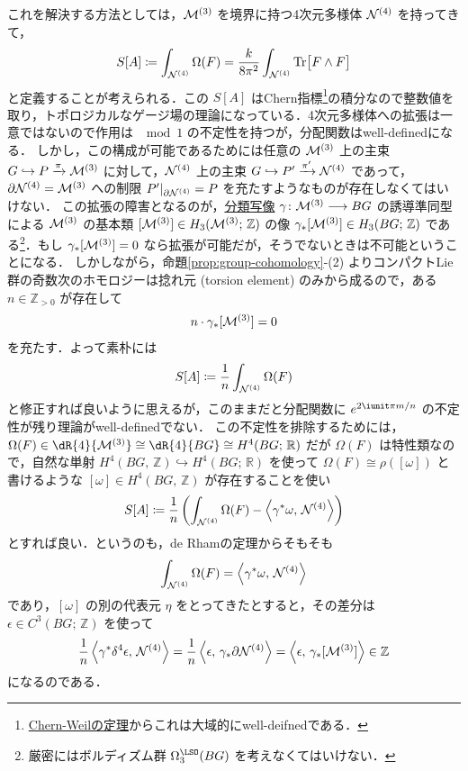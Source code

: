 \documentclass[TQFT_main]{subfiles}
\begin{document}
これを解決する方法としては，$\mathcal{M}^{(3)}$ を境界に持つ4次元多様体 $\mathcal{N}^{(4)}$ を持ってきて，
\begin{align}
    S[A] \coloneqq \int_{\mathcal{N}^{(4)}} \Omega(F) = \frac{k}{8\pi^2} \int_{\mathcal{N}^{(4)}} \Tr \bigl[ F \wedge F \bigr] 
\end{align}
と定義することが考えられる．この $S[A]$ はChern指標\footnote{\hyperref[thm:Chern-Weil]{Chern-Weilの定理}からこれは大域的にwell-deifnedである．}の積分なので整数値を取り，トポロジカルなゲージ場の理論になっている．4次元多様体への拡張は一意ではないので作用は $\mod 1$ の不定性を持つが，分配関数はwell-definedになる．
しかし，この構成が可能であるためには任意の $\mathcal{M}^{(3)}$ 上の主束 $G \hookrightarrow P \xrightarrow{\pi} \mathcal{M}^{(3)}$ に対して，$\mathcal{N}^{(4)}$ 上の主束 $G \hookrightarrow P' \xrightarrow{\pi'} \mathcal{N}^{(4)}$ であって，$\partial \mathcal{N}^{(4)} = \mathcal{M}^{(3)}$ への制限 $P'|_{\partial \mathcal{N}^{(4)}} = P$ を充たすようなものが存在しなくてはいけない．
この拡張の障害となるのが，\hyperref[prop:universal-basic]{分類写像} $\gamma \colon \mathcal{M}^{(3)} \longrightarrow BG$ の誘導準同型による $\mathcal{M}^{(3)}$ の基本類 $[\mathcal{M}^{(3)}] \in H_3(\mathcal{M}^{(3)};\, \mathbb{Z})$ の像 $\gamma_* [\mathcal{M}^{(3)}] \in H_3(BG;\, \mathbb{Z})$ である\footnote{厳密にはボルディズム群 $\Omega^{\LSO}_{3} (BG)$ を考えなくてはいけない．}．もし $\gamma_* [\mathcal{M}^{(3)}] = 0$ なら拡張が可能だが，そうでないときは不可能ということになる．
しかしながら，命題\ref{prop:group-cohomology}-(2) よりコンパクトLie群の奇数次のホモロジーは捻れ元 (torsion element) のみから成るので，ある $n \in \mathbb{Z}_{> 0}$ が存在して
\begin{align}
    n \cdot \gamma_* [\mathcal{M}^{(3)}] = 0
\end{align}
を充たす．よって素朴には
\begin{align}
    S[A] \coloneqq \frac{1}{n} \int_{\mathcal{N}^{(4)}} \Omega(F)
\end{align}
と修正すれば良いように思えるが，このままだと分配関数に $e^{2\iunit \pi m/n}$ の不定性が残り理論がwell-definedでない．
この不定性を排除するためには，$\Omega(F) \in \dR{4}{\mfdcal{M}{3}} \cong \dR{4}{BG} \cong H^4(BG;\, \mathbb{R})$ だが $\Omega(F)$ は特性類なので，自然な単射 $H^4(BG,\, \mathbb{Z}) \hookrightarrow H^4(BG;\, \mathbb{R})$ を使って $\Omega(F) \cong \rho ([\omega])$ と書けるような $[\omega] \in H^4(BG,\, \mathbb{Z})$ が存在することを使い
\begin{align}
    S[A] \coloneqq \frac{1}{n} \left(\int_{\mathcal{N}^{(4)}} \Omega(F) - \expval{\gamma^* \omega,\, \mathcal{N}^{(4)}} \right)
\end{align}
とすれば良い．というのも，de Rhamの定理からそもそも
\begin{align}
    \int_{\mathcal{N}^{(4)}} \Omega(F) = \expval{\gamma^* \omega,\, \mathcal{N}^{(4)}}
\end{align}
であり，$[\omega]$ の別の代表元 $\eta$ をとってきたとすると，その差分は $\epsilon \in C^3(BG;\, \mathbb{Z})$ を使って
\begin{align}
    \frac{1}{n} \expval{\gamma^* \delta^4 \epsilon,\, \mathcal{N}^{(4)}} = \frac{1}{n} \expval{\epsilon,\, \gamma_* \partial \mathcal{N}^{(4)}} = \expval{\epsilon,\, \gamma_* [\mathcal{M}^{(3)}]} \in \mathbb{Z}
\end{align}
になるのである．
\end{document}

